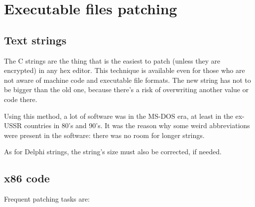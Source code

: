 \section{Executable files patching}

\subsection{Text strings}

The C strings are the thing that is the easiest to patch (unless they are encrypted) in any hex editor.
This technique is available even for those who are not aware of machine code and executable file formats.
The new string has not to be bigger than the old one, because there's a risk of overwriting another value or code
there.

Using this method, a lot of software was  in the MS-DOS era, at least in the ex-USSR countries in 80's
and 90's.
It was the reason why some weird abbreviations were present in the  software: there was no room for
longer strings.


As for Delphi strings, the string's size must also be corrected, if needed.

\subsection{x86 code}
\label{x86_patching}

Frequent patching tasks are:

